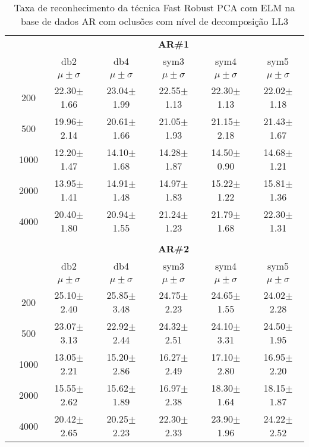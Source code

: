 \begin{table}[H]
	\centering
    \normalsize
	\caption{Taxa de reconhecimento da técnica Fast Robust PCA com ELM na base de dados AR com oclusões com nível de decomposição LL3}
	\begin{tabular}{|c|c|c c c c c|}
\cline{3-7}
\multicolumn{2}{c|}{\multirow{3}{*}{}} & \multicolumn{5}{c|}{\textbf{AR\#1}}   \\\cline{3-7} 
\multicolumn{2}{c|}{}  & db2 & db4 & sym3 & sym4 & sym5 \\\cline{3-7}%
\multicolumn{2}{c|}{}& $\mu \pm \sigma$ & $\mu \pm \sigma$ & $\mu \pm \sigma$ & $\mu \pm \sigma$ & $\mu \pm \sigma$ \\\hline


\multicolumn{1}{|c|}{ \multirow{5}{*}{\rotatebox[origin=c]{90}{\textbf{Neurônios}}} }
&200	    &22.30$\pm$1.66	&23.04$\pm$1.99	&22.55$\pm$1.13	&22.30$\pm$1.13	&22.02$\pm$1.18	\\\cline{2-7}
&500	    &19.96$\pm$2.14	&20.61$\pm$1.66	&21.05$\pm$1.93	&21.15$\pm$2.18	&21.43$\pm$1.67	\\\cline{2-7}
&1000	    &12.20$\pm$1.47	&14.10$\pm$1.68	&14.28$\pm$1.87	&14.50$\pm$0.90	&14.68$\pm$1.21	\\\cline{2-7}
&2000	    &13.95$\pm$1.41	&14.91$\pm$1.48	&14.97$\pm$1.83 &15.22$\pm$1.22	&15.81$\pm$1.36	\\\cline{2-7}
&4000	    &20.40$\pm$1.80	&20.94$\pm$1.55	&21.24$\pm$1.23	&21.79$\pm$1.68	&22.30$\pm$1.31	




\\\midrule%

\multicolumn{7}{c}{}\\ 

\cline{3-7}
\multicolumn{2}{c|}{\multirow{3}{*}{}} & \multicolumn{5}{c|}{\textbf{AR\#2}}   \\\cline{3-7} 

\multicolumn{2}{c|}{}  & db2 & db4 & sym3 & sym4 & sym5 \\\cline{3-7}
\multicolumn{2}{c|}{}& $\mu \pm \sigma$ & $\mu \pm \sigma$ & $\mu \pm \sigma$ & $\mu \pm \sigma$ & $\mu \pm \sigma$ \\\hline


\multicolumn{1}{|c|}{ \multirow{5}{*}{\rotatebox[origin=c]{90}{\textbf{Neurônios}}} }
&200	&25.10$\pm$2.40	&25.85$\pm$3.48	&24.75$\pm$2.23	&24.65$\pm$1.55	&24.02$\pm$2.28	\\\cline{2-7}
&500	&23.07$\pm$3.13	&22.92$\pm$2.44	&24.32$\pm$2.51	&24.10$\pm$3.31	&24.50$\pm$1.95	\\\cline{2-7}
&1000	&13.05$\pm$2.21	&15.20$\pm$2.86	&16.27$\pm$2.49	&17.10$\pm$2.80	&16.95$\pm$2.20	\\\cline{2-7}
&2000	&15.55$\pm$2.62	&15.62$\pm$1.89	&16.97$\pm$2.38	&18.30$\pm$1.64	&18.15$\pm$1.87	\\\cline{2-7}
&4000	&20.42$\pm$2.65	&20.25$\pm$2.23	&22.30$\pm$2.33	&23.90$\pm$1.96	&24.22$\pm$2.52	


\end{tabular}
\end{table}
